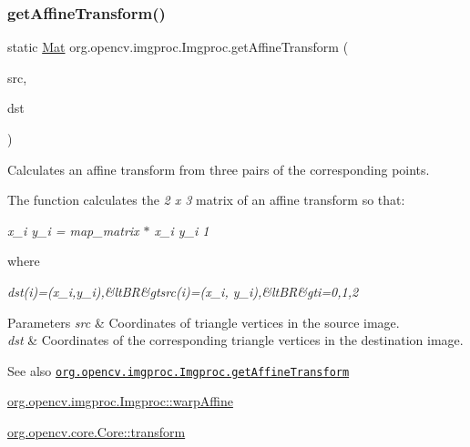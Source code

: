 \subsubsection{\texorpdfstring{get\+Affine\+Transform()}{getAffineTransform()}}
{\footnotesize\ttfamily static \mbox{\hyperlink{classorg_1_1opencv_1_1core_1_1_mat}{Mat}} org.\+opencv.\+imgproc.\+Imgproc.\+get\+Affine\+Transform (\begin{DoxyParamCaption}\item[{\mbox{\hyperlink{classorg_1_1opencv_1_1core_1_1_mat_of_point2f}{Mat\+Of\+Point2f}}}]{src,  }\item[{\mbox{\hyperlink{classorg_1_1opencv_1_1core_1_1_mat_of_point2f}{Mat\+Of\+Point2f}}}]{dst }\end{DoxyParamCaption})\hspace{0.3cm}{\ttfamily [static]}}

Calculates an affine transform from three pairs of the corresponding points.

The function calculates the {\itshape 2 x 3} matrix of an affine transform so that\+:

{\itshape x\textquotesingle{}\+\_\+i y\textquotesingle{}\+\_\+i = map\+\_\+matrix $\ast$ x\+\_\+i y\+\_\+i 1 }

where

{\itshape dst(i)=(x\textquotesingle{}\+\_\+i,y\textquotesingle{}\+\_\+i),\&lt\+BR\&gtsrc(i)=(x\+\_\+i, y\+\_\+i),\&lt\+BR\&gti=0,1,2}


\begin{DoxyParams}{Parameters}
{\em src} & Coordinates of triangle vertices in the source image. \\
\hline
{\em dst} & Coordinates of the corresponding triangle vertices in the destination image.\\
\hline
\end{DoxyParams}
\begin{DoxySeeAlso}{See also}
\href{http://docs.opencv.org/modules/imgproc/doc/geometric_transformations.html#getaffinetransform}{\tt org.\+opencv.\+imgproc.\+Imgproc.\+get\+Affine\+Transform} 

\mbox{\hyperlink{classorg_1_1opencv_1_1imgproc_1_1_imgproc_a139ccfb9b241fc867096f4c850088058}{org.\+opencv.\+imgproc.\+Imgproc\+::warp\+Affine}} 

\mbox{\hyperlink{classorg_1_1opencv_1_1core_1_1_core_a221e7697d1a57961ee8a843b7aa05b75}{org.\+opencv.\+core.\+Core\+::transform}} 
\end{DoxySeeAlso}
\mbox{\label{classorg_1_1opencv_1_1imgproc_1_1_imgproc_adaa73e104d926966ba7d5666c4458e51}} 

